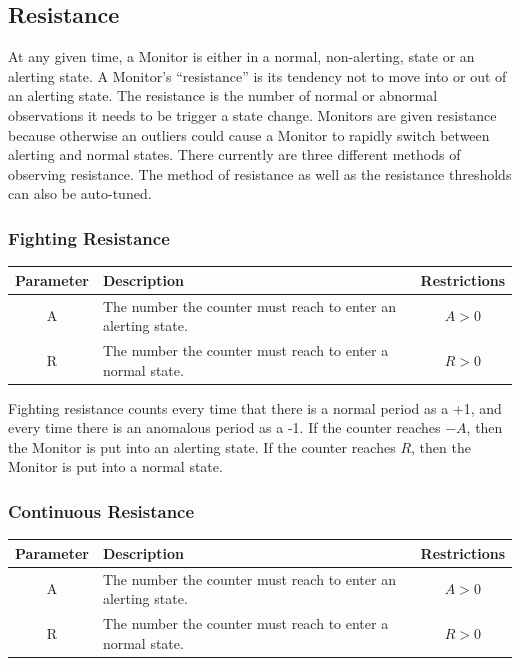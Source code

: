 \documentclass[12pt]{ucthesis}
\begin{document}
\subsection{Resistance}
\label{arch-resistance}
At any given time, a Monitor is either in a normal, non-alerting, state or an alerting state.
A Monitor's ``resistance'' is its tendency not to move into or out of an alerting state.
The resistance is the number of normal or abnormal observations it needs to be
trigger a state change. Monitors are given resistance because otherwise an outliers could cause
a Monitor to rapidly switch between alerting and normal states.
There currently are three different methods of observing resistance.
The method of resistance as well as the resistance thresholds can also be auto-tuned.

\subsubsection{Fighting Resistance}
\begin{table}[H]
   \begin{center}
      \begin{tabular}{|c|p{9cm}|c|}
         \hline
            Parameter & Description & Restrictions \\
         \hline
            A & The number the counter must reach to enter an alerting state. & $ A > 0 $ \\
         \hline
            R & The number the counter must reach to enter a normal state. & $ R > 0 $ \\
         \hline
      \end{tabular}
   \end{center}
\end{table}

Fighting resistance counts every time that there is a normal period as a +1, and every time there is
an anomalous period as a -1. If the counter reaches $-A$, then the Monitor is put into an alerting state.
If the counter reaches $R$, then the Monitor is put into a normal state.

\subsubsection{Continuous Resistance}
\begin{table}[H]
   \begin{center}
      \begin{tabular}{|c|p{9cm}|c|}
         \hline
            Parameter & Description & Restrictions \\
         \hline
            A & The number the counter must reach to enter an alerting state. & $ A > 0 $ \\
         \hline
            R & The number the counter must reach to enter a normal state. & $ R > 0 $ \\
         \hline
      \end{tabular}
   \end{center}
\end{table}
\end{document}
